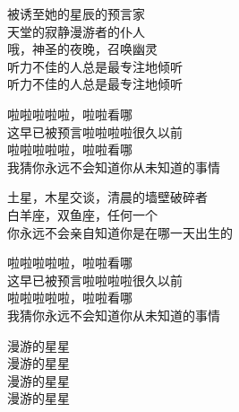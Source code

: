 \documentclass[12pt]{ctexart}
\begin{document}
\begin{paracol}{2}
		\switchcolumn
		
		\zhfont
		
		被诱至她的星辰的预言家\\
		天堂的寂静漫游者的仆人\\
		哦，神圣的夜晚，召唤幽灵\\
		听力不佳的人总是最专注地倾听\\
		听力不佳的人总是最专注地倾听
		
		\hspace{2em}
		
		啦啦啦啦啦，啦啦看哪\\
		这早已被预言啦啦啦啦很久以前\\
		啦啦啦啦啦，啦啦看哪\\
		我猜你永远不会知道你从未知道的事情
		
		\hspace{2em}
		
		土星，木星交谈，清晨的墙壁破碎者\\
		白羊座，双鱼座，任何一个\\
		你永远不会亲自知道你是在哪一天出生的
		
		\hspace{2em}
		
		啦啦啦啦啦，啦啦看哪\\
		这早已被预言啦啦啦啦很久以前\\
		啦啦啦啦啦，啦啦看哪\\
		我猜你永远不会知道你从未知道的事情
		
		\hspace{2em}
		
		漫游的星星\\
		漫游的星星\\
		漫游的星星\\
		漫游的星星
		
	\end{paracol}
	
\end{document}
